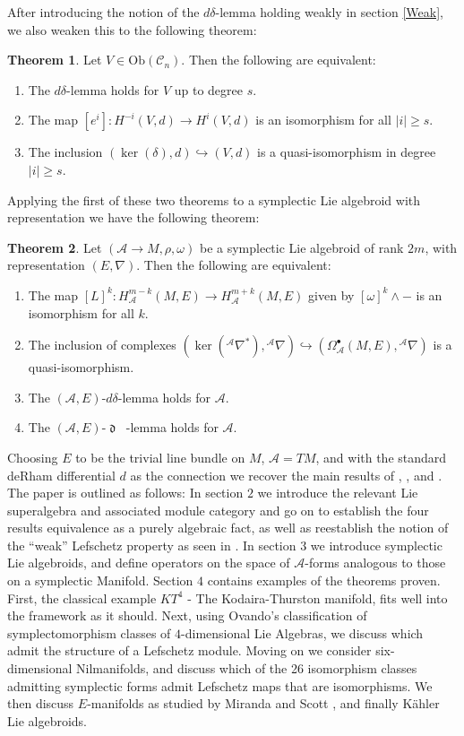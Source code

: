 \documentclass{amsart}
\newcommand{\ra}{\rightarrow}
\newcommand{\A}{\mathcal{A}}
\DeclareMathOperator{\dee}{\mathfrak{d}}
\DeclareMathOperator{\deebar}{\overline{\mathfrak{d}}}
\theoremstyle{definition}
\newtheorem*{theorem*}{Theorem}
\begin{document}
After introducing the notion of the $d \delta$-lemma holding weakly in section \ref{Weak}, we also weaken this to the following theorem:
\begin{theorem*}
    Let $V \in \mathrm{Ob}(\mathscr{C}_n)$. Then the following are equivalent:
    \begin{enumerate}
        \item The $d\delta$-lemma holds for $V$ up to degree $s$.
        \item The map $[e^i]:H^{-i}(V,d) \ra H^i(V,d)$ is an isomorphism for all $|i|\geq s$.
        \item The inclusion $(\ker(\delta),d) \hookrightarrow (V,d)$ is a quasi-isomorphism in degree $|i| \geq s$.
    \end{enumerate}
\end{theorem*}
Applying the first of these two theorems to a symplectic Lie algebroid with representation we have the following theorem:
\begin{theorem*}
    Let $(\A \ra M, \rho, \omega)$ be a symplectic Lie algebroid of rank $2m$, with representation $(E,\nabla)$. Then the following are equivalent:
    \begin{enumerate}
        \item The map $[L]^k:H^{m-k}_\A(M,E) \ra H^{m+k}_\A(M,E)$ given by $[\omega]^k \wedge -$ is an isomorphism for all $k$.
        \item The inclusion of complexes $(\ker({}^\A\nabla^*), {}^\A \nabla) \hookrightarrow (\Omega_\A^\bullet(M,E),{}^\A \nabla)$ is a quasi-isomorphism.
        \item The $(\A,E)$-$d\delta$-lemma holds for $\A$.
        \item The $(\A,E)$-$\dee \deebar$-lemma holds for $\A$.
    \end{enumerate}
\end{theorem*}
Choosing $E$ to be the trivial line bundle on $M$, $\A = TM$, and with the standard deRham differential $d$ as the connection we recover the main results of \cite{YAN1996143}, \cite{Mathieu}, and \cite{HoSym}. The paper is outlined as follows: In section $2$ we introduce the relevant Lie superalgebra and associated module category and go on to establish the four results equivalence as a purely algebraic fact, as well as reestablish the notion of the ``weak'' Lefschetz property as seen in \cite{fernández2005ddeltalemmaweaklylefschetzsymplectic}. In section $3$ we introduce symplectic Lie algebroids, and define operators on the space of $\A$-forms analogous to those on a symplectic Manifold. Section $4$ contains examples of the theorems proven. First, the classical example $KT^4$ - The Kodaira-Thurston manifold, fits well into the framework as it should. Next, using Ovando's \cite{ovando2004dimensional} classification of symplectomorphism classes of $4$-dimensional Lie Algebras, we discuss which admit the structure of a Lefschetz module. Moving on we consider six-dimensional Nilmanifolds, and discuss which of the 26 isomorphism classes admitting symplectic forms admit Lefschetz maps that are isomorphisms. We then discuss $E$-manifolds as studied by Miranda and Scott \cite{Miranda_2020}, and finally K\"ahler Lie algebroids.
\end{document}
